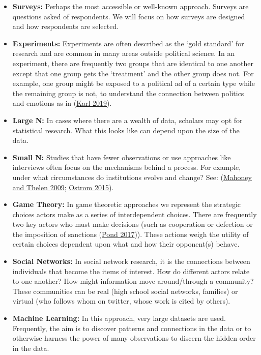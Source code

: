 \documentclass{book}
\begin{document}
\begin{itemize}
\item
  \textbf{Surveys:} Perhaps the most accessible or well-known approach.
  Surveys are questions asked of respondents. We will focus on how surveys are
  designed and how respondents are selected.
\item
  \textbf{Experiments:} Experiments are often described as the `gold standard'
  for research and are common in many areas outside political science. In an
  experiment, there are frequently two groups that are identical to one
  another except that one group gets the `treatment' and the other group does
  not. For example, one group might be exposed to a political ad of a certain
  type while the remaining group is not, to understand the connection between
  politics and emotions as in (\protect\hyperlink{ref-Karl2019}{Karl 2019}).
\item
  \textbf{Large N:} In cases where there are a wealth of data, scholars may
  opt for statistical research. What this looks like can depend upon the size
  of the data.
\item
  \textbf{Small N:} Studies that have fewer observations or use approaches
  like interviews often focus on the mechanisms behind a process. For example,
  under what circumstances do institutions evolve and change? See:
  (\protect\hyperlink{ref-mahoney2009explaining}{Mahoney and Thelen 2009};
  \protect\hyperlink{ref-ostrom_2015}{Ostrom 2015}).
\item
  \textbf{Game Theory:} In game theoretic approaches we represent the
  strategic choices actors make as a series of interdependent choices. There
  are frequently two key actors who must make decisions (such as cooperation
  or defection or the imposition of sanctions
  (\protect\hyperlink{ref-pond2017}{Pond 2017})). These actions weigh the
  utility of certain choices dependent upon what and how their opponent(s)
  behave.
\item
  \textbf{Social Networks:} In social network research, it is the connections
  between individuals that become the items of interest. How do different
  actors relate to one another? How might information move around/through a
  community? These communities can be real (high school social networks,
  families) or virtual (who follows whom on twitter, whose work is cited by
  others).
\item
  \textbf{Machine Learning:} In this approach, very large datasets are used.
  Frequently, the aim is to discover patterns and connections in the data or
  to otherwise harness the power of many observations to discern the hidden
  order in the data.
\end{itemize}
\end{document}

